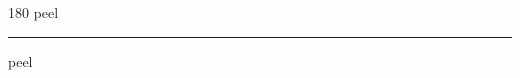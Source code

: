 
\begin{frame}
\begin{center}
\begin{turn}{180}
{\fontsize{2.5cm}{1em}\selectfont peel}
\end{turn}
\vspace{1em}\par  
\hrule
\vspace{1em}\par  
{\fontsize{2.5cm}{1em}\selectfont peel}
\end{center}
\end{frame}

